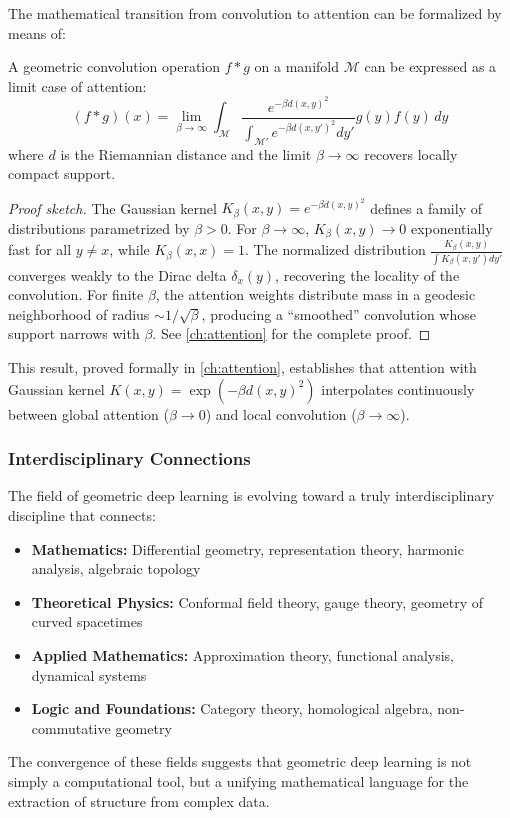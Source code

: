 The mathematical transition from convolution to attention can be formalized by means of:

\begin{theorem}
A geometric convolution operation $f * g$ on a manifold $\mathcal{M}$ can be expressed as a limit case of attention:
\begin{equation}
(f * g)(x) = \lim_{\beta \to \infty} \int_{\mathcal{M}} \frac{e^{-\beta d(x,y)^2}}{\int_{\mathcal{M}'} e^{-\beta d(x,y')^2} dy'} g(y) f(y) \, dy
\end{equation}
where $d$ is the Riemannian distance and the limit $\beta \to \infty$ recovers locally compact support.
\end{theorem}

\begin{proof}[Proof sketch]
The Gaussian kernel $K_\beta(x,y) = e^{-\beta d(x,y)^2}$ defines a family of distributions parametrized by $\beta > 0$. For $\beta \to \infty$, $K_\beta(x,y) \to 0$ exponentially fast for all $y \neq x$, while $K_\beta(x,x) = 1$. The normalized distribution $\frac{K_\beta(x,y)}{\int K_\beta(x,y') dy'}$ converges weakly to the Dirac delta $\delta_x(y)$, recovering the locality of the convolution. For finite $\beta$, the attention weights distribute mass in a geodesic neighborhood of radius $\sim 1/\sqrt{\beta}$, producing a ``smoothed'' convolution whose support narrows with $\beta$. See \autoref{ch:attention} for the complete proof.
\end{proof}

This result, proved formally in \autoref{ch:attention}, establishes that attention with Gaussian kernel $K(x,y) = \exp(-\beta d(x,y)^2)$ interpolates continuously between global attention ($\beta \to 0$) and local convolution ($\beta \to \infty$).

\subsubsection{Interdisciplinary Connections}

The field of geometric deep learning is evolving toward a truly interdisciplinary discipline that connects:

\begin{itemize}
\item \textbf{Mathematics:} Differential geometry, representation theory, harmonic analysis, algebraic topology
\item \textbf{Theoretical Physics:} Conformal field theory, gauge theory, geometry of curved spacetimes
\item \textbf{Applied Mathematics:} Approximation theory, functional analysis, dynamical systems
\item \textbf{Logic and Foundations:} Category theory, homological algebra, non-commutative geometry
\end{itemize}

The convergence of these fields suggests that geometric deep learning is not simply a computational tool, but a unifying mathematical language for the extraction of structure from complex data.
